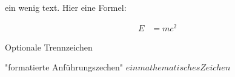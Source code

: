 
ein wenig text. Hier eine Formel:

    \begin{align} E &= mc^2 \end{align}

    Op\-tion\-ale Trenn\-zeich\-en

"formatierte Anführungszechen"
$ein mathematisches Zeichen$
